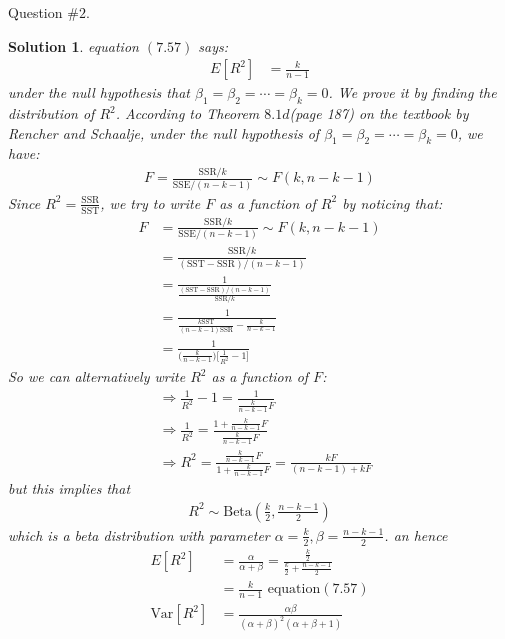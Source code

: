 \documentclass[11pt]{article}
\newtheorem{sol}{Solution}
\begin{document}
Question $\# 2.$
\begin{sol}
	equation $(7.57)$ says:
	\begin{align*}
		E[R^2] &= \frac{k}{n - 1}
	\end{align*}
	under the null hypothesis that $\beta_1 = \beta_2 = \cdots = \beta_k = 0$.\vskip 2mm
	We prove it by finding the distribution of $R^2$.\vskip 2mm
	According to Theorem $8.1d$(page 187) on the textbook by Rencher and Schaalje, under the null hypothesis of $\beta_1 = \beta_2 = \cdots = \beta_k = 0$, we have:
	\begin{align*}
		F = \frac{\text{SSR}/k}{\text{SSE}/(n - k - 1)} \sim F(k, n - k - 1)
	\end{align*}
	Since $R^2 = \frac{\text{SSR}}{\text{SST}}$, we try to write $F$ as a function of $R^2$ by noticing that:
	\begin{align*}
		F &= \frac{\text{SSR}/k}{\text{SSE}/(n - k - 1)} \sim F(k, n - k - 1)\\
		   &= \frac{\text{SSR}/k}{(\text{SST} - \text{SSR})/(n - k - 1)}\\
		   &= \frac{1}{\frac{(\text{SST} - \text{SSR})/(n - k - 1)}{\text{SSR}/k}}\\
		   &= \frac{1}{\frac{k\text{SST}}{(n - k - 1)\text{SSR}} - \frac{k}{n - k - 1}}\\
		   &= \frac{1}{\Big(\frac{k}{n - k - 1}\Big)\Big[\frac{1}{R^2} - 1\Big]}
	\end{align*}
	So we can alternatively write $R^2$ as a function of $F$:
	\begin{align*}
		&\Longrightarrow \frac{1}{R^2} - 1 = \frac{1}{\frac{k}{n - k - 1}F}\\
		&\Longrightarrow \frac{1}{R^2} =\frac{1 + \frac{k}{n - k - 1}F}{\frac{k}{n - k - 1}F}\\
		&\Longrightarrow R^2 = \frac{\frac{k}{n - k - 1}F}{1 + \frac{k}{n - k - 1}F} = \frac{kF}{(n - k - 1) + kF}
	\end{align*}
	but this implies that
	\begin{align*}
		R^2 \sim \text{Beta}(\frac{k}{2}, \frac{n - k - 1}{2})
	\end{align*}
	which is a beta distribution with parameter $\alpha = \frac{k}{2}, \beta =\frac{n - k - 1}{2} $.
	an hence
	\begin{align*}
		E[R^2] &= \frac{\alpha}{\alpha + \beta} = \frac{\frac{k}{2}}{\frac{k}{2} +\frac{n - k - 1}{2} }\\
		&= \frac{k}{n - 1} \text{ equation}(7.57) \\
		\text{Var}[R^2] &= \frac{\alpha\beta}{(\alpha + \beta)^2(\alpha + \beta + 1)}\\

\end{align*}
\end{sol}
\end{document}
